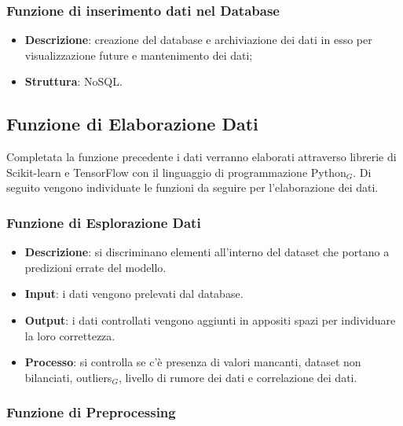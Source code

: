 \subsubsection{Funzione di inserimento dati nel Database}\label{DescrizioneGeneraleFunzionalitàDelProdottoFunzioneDiAcquisizioneDiDatiFunzioneDiInserimentoDatiNelDatabase}

\begin{itemize}
	\item \textbf{Descrizione}: creazione del database e archiviazione dei dati in esso per visualizzazione future e mantenimento dei dati;
	\item \textbf{Struttura}: NoSQL.
\end{itemize}


\subsection{Funzione di Elaborazione Dati}\label{DescrizioneGeneraleFunzionalitàDelProdottoFunzioneDiElaborazioneDati}
Completata la funzione precedente i dati verranno elaborati attraverso librerie di Scikit-learn e TensorFlow con il linguaggio di programmazione Python$_G$.
Di seguito vengono individuate le funzioni da seguire per l'elaborazione dei dati.

\subsubsection{Funzione di Esplorazione Dati}\label{DescrizioneGeneraleFunzionalitàDelProdottoFunzioneDiElaborazioneDatiFunzioneDiEsplorazioneDati}

\begin{itemize}
	\item \textbf{Descrizione}: si discriminano elementi all'interno del dataset che portano a predizioni errate del modello.
	\item \textbf{Input}: i dati vengono prelevati dal database.
	\item \textbf{Output}: i dati controllati vengono aggiunti in appositi spazi per individuare la loro correttezza.
	\item \textbf{Processo}: si controlla se c'è presenza di valori mancanti, dataset non bilanciati, outliers$_G$, livello di rumore dei dati e correlazione dei dati.
\end{itemize}

\subsubsection{Funzione di Preprocessing}\label{DescrizioneGeneraleFunzionalitàDelProdottoFunzioneDiElaborazioneDatiFunzioneDiPreprocessing}

